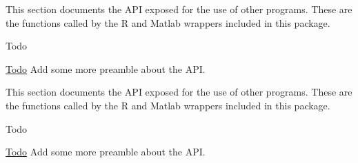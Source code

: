 This section documents the A\-P\-I exposed for the use of other programs. These are the functions called by the R and Matlab wrappers included in this package. \begin{DoxyRefDesc}{Todo}
\item[\hyperlink{todo__todo000029}{Todo}]Add some more preamble about the A\-P\-I.\end{DoxyRefDesc}


This section documents the A\-P\-I exposed for the use of other programs. These are the functions called by the R and Matlab wrappers included in this package. \begin{DoxyRefDesc}{Todo}
\item[\hyperlink{todo__todo000044}{Todo}]Add some more preamble about the A\-P\-I.\end{DoxyRefDesc}


